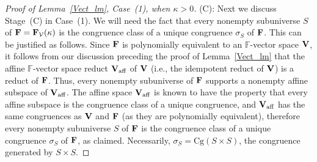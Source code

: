 \documentclass[12pt]{amsart}
\theoremstyle{definition}
\numberwithin{equation}{section}
\newcommand{\m}[1]{{\mathbf{\uppercase{#1}}}}
\newcommand{\cg}{\mathrm{Cg}}
\begin{document}
\begin{proof}[Proof of Lemma~\ref{Vect_lm}, Case~(1), when $\kappa>0$]
(C): Next we discuss Stage~(C) in Case~(1).
We will need the fact that every nonempty subuniverse $S$ of
$\m f = \m f_{\mathcal{V}}(\kappa)$ is the congruence class of a unique
congruence $\sigma_S$ of $\m f$. This can be justified as follows.
Since $\m f$
is polynomially equivalent to an $\mathbb{F}$-vector space $\m v$,
it follows from our discussion preceding the proof of Lemma~\ref{Vect_lm}
that the affine $\mathbb{F}$-vector space reduct $\m v_{\text{\rm aff}}$
of $\m v$ (i.e., the idempotent reduct of $\m v$) is a reduct of $\m f$.
Thus, every nonempty subuniverse of $\m f$ supports a
nonempty affine subspace of $\m v_{\text{\rm aff}}$.
The affine space $\m v_{\text{\rm aff}}$ is known to have the property that
every affine subspace is the congruence class of a unique congruence, and
$\m v_{\text{\rm aff}}$ has the same congruences as $\m v$ and $\m f$ (as they
are polynomially equivalent), therefore every nonempty subuniverse $S$ of
$\m f$ is the congruence
class of a unique congruence $\sigma_S$ of $\m f$, as claimed.
Necessarily, $\sigma_S=\cg(S\times S)$, the congruence generated by $S\times S$.


\end{proof}
\end{document}
